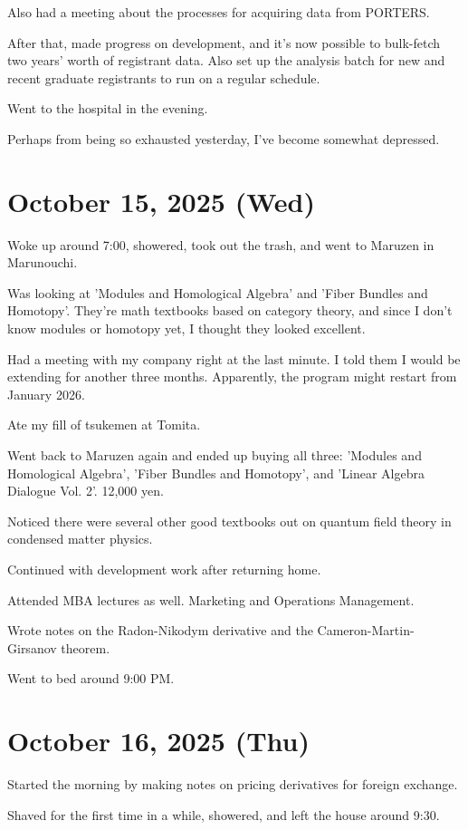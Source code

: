 \documentclass[uplatex]{jsarticle}
\begin{document}
Also had a meeting about the processes for acquiring data from PORTERS.

After that, made progress on development, and it's now possible to bulk-fetch two years' worth of registrant data.
Also set up the analysis batch for new and recent graduate registrants to run on a regular schedule.

Went to the hospital in the evening.

Perhaps from being so exhausted yesterday, I've become somewhat depressed.

\section{October 15, 2025 (Wed)}

Woke up around 7:00, showered, took out the trash, and went to Maruzen in Marunouchi.

Was looking at 'Modules and Homological Algebra' and 'Fiber Bundles and Homotopy'. They're math textbooks based on category theory, and since I don't know modules or homotopy yet, I thought they looked excellent.

Had a meeting with my company right at the last minute.
I told them I would be extending for another three months.
Apparently, the program might restart from January 2026.

Ate my fill of tsukemen at Tomita.

Went back to Maruzen again and ended up buying all three: 'Modules and Homological Algebra', 'Fiber Bundles and Homotopy', and 'Linear Algebra Dialogue Vol. 2'. 12,000 yen.

Noticed there were several other good textbooks out on quantum field theory in condensed matter physics.

Continued with development work after returning home.

Attended MBA lectures as well. Marketing and Operations Management.

Wrote notes on the Radon-Nikodym derivative and the Cameron-Martin-Girsanov theorem.

Went to bed around 9:00 PM.

\section{October 16, 2025 (Thu)}

Started the morning by making notes on pricing derivatives for foreign exchange.

Shaved for the first time in a while, showered, and left the house around 9:30.
\end{document}
